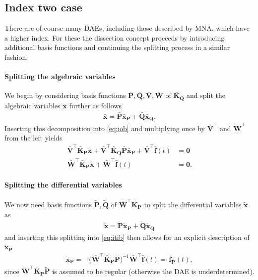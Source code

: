 \documentclass[AMA,STIX1COL]{WileyNJD-v2}
\newcommand{\mb}[1]{\mathbf{#1}}
\newcommand{\mbt}[1]{\tilde{\mathbf{#1}}}
\newcommand{\mbb}[1]{\bar{\mathbf{#1}}}
\newcommand{\T}{{\!\top}}
\begin{document}
\subsection{Index two case}
There are of course many DAEs, including those described by MNA, which have a higher index. For these the dissection concept proceeds by introducing additional basis functions and continuing the splitting process in a similar fashion.

\paragraph{Splitting the algebraic variables}
We begin by considering basis functions $\mbb{P}, \mbb{Q}, \mbb{V}, \mbb{W}$ of $\mbb{K}_\mb{Q}$ and split the algebraic variables $\mbb{x}$ further as follows
\begin{align}
    \mbb{x} = \mbb{P} \mbb{x}_\mb{P} + \mbb{Q} \mbb{x}_\mb{Q} \label{eq:xb}.
\end{align}
Inserting this decomposition into \eqref{eq:iob} and multiplying once by $\mbb{V}^{\T}$ and $\mbb{W}^{\T}$ from the left yields
\begin{subequations}
    \label{eq:iti}
    \begin{align}
        \mbb{V}^{\T} \mbb{K}_\mb{P} \mbt{x} + \mbb{V}^{\T} \mbb{K}_\mb{Q} \mbb{P} \mbb{x}_\mb{P} + \mbb{V}^{\T} \mbb{f}(t) &= \mb{0} \label{eq:itia}\\
        \mbb{W}^{\T} \mbb{K}_\mb{P} \mbt{x} + \mbb{W}^{\T} \mbb{f}(t) &= \mb{0} \label{eq:itib}.
    \end{align}
\end{subequations}

\paragraph{Splitting the differential variables}
We now need basis functions $\mbt{P}, \mbt{Q}$ of $\mbb{W}^{\T} \mbb{K}_\mb{P}$ to split the differential variables $\mbt{x}$ as
\begin{align}
    \mbt{x} = \mbt{P} \mbt{x}_\mb{P} +
    \mbt{Q} \mbt{x}_\mb{Q} \label{eq:xt}
\end{align}
and inserting this splitting into \eqref{eq:itib} then allows for an explicit description of $\mbt{x}_\mb{P}$
\begin{align*}
    \mbt{x}_\mb{P} = -\big( \mbb{W}^{\T} \mbb{K}_\mb{P} \mbt{P} \big)^{-1} \mbb{W}^{\T} \mbb{f}(t) \eqqcolon \mbt{f}_\mb{P}(t),
\end{align*}
since $\mbb{W}^{\T} \mbb{K}_\mb{P} \mbt{P}$ is assumed to be regular (otherwise the DAE is underdetermined\cite{jansen2014}).
\end{document}
